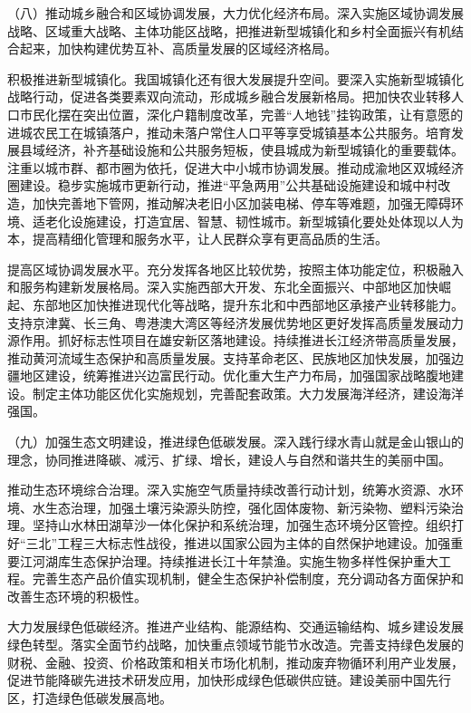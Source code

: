 \documentclass[10pt, UTF8]{ctexbook} %
\begin{document}
（八）推动城乡融合和区域协调发展，大力优化经济布局。深入实施区域协调发展战略、区域重大战略、主体功能区战略，把推进新型城镇化和乡村全面振兴有机结合起来，加快构建优势互补、高质量发展的区域经济格局。

积极推进新型城镇化。我国城镇化还有很大发展提升空间。要深入实施新型城镇化战略行动，促进各类要素双向流动，形成城乡融合发展新格局。把加快农业转移人口市民化摆在突出位置，深化户籍制度改革，完善“人地钱”挂钩政策，让有意愿的进城农民工在城镇落户，推动未落户常住人口平等享受城镇基本公共服务。培育发展县域经济，补齐基础设施和公共服务短板，使县城成为新型城镇化的重要载体。注重以城市群、都市圈为依托，促进大中小城市协调发展。推动成渝地区双城经济圈建设。稳步实施城市更新行动，推进“平急两用”公共基础设施建设和城中村改造，加快完善地下管网，推动解决老旧小区加装电梯、停车等难题，加强无障碍环境、适老化设施建设，打造宜居、智慧、韧性城市。新型城镇化要处处体现以人为本，提高精细化管理和服务水平，让人民群众享有更高品质的生活。

提高区域协调发展水平。充分发挥各地区比较优势，按照主体功能定位，积极融入和服务构建新发展格局。深入实施西部大开发、东北全面振兴、中部地区加快崛起、东部地区加快推进现代化等战略，提升东北和中西部地区承接产业转移能力。支持京津冀、长三角、粤港澳大湾区等经济发展优势地区更好发挥高质量发展动力源作用。抓好标志性项目在雄安新区落地建设。持续推进长江经济带高质量发展，推动黄河流域生态保护和高质量发展。支持革命老区、民族地区加快发展，加强边疆地区建设，统筹推进兴边富民行动。优化重大生产力布局，加强国家战略腹地建设。制定主体功能区优化实施规划，完善配套政策。大力发展海洋经济，建设海洋强国。

（九）加强生态文明建设，推进绿色低碳发展。深入践行绿水青山就是金山银山的理念，协同推进降碳、减污、扩绿、增长，建设人与自然和谐共生的美丽中国。

推动生态环境综合治理。深入实施空气质量持续改善行动计划，统筹水资源、水环境、水生态治理，加强土壤污染源头防控，强化固体废物、新污染物、塑料污染治理。坚持山水林田湖草沙一体化保护和系统治理，加强生态环境分区管控。组织打好“三北”工程三大标志性战役，推进以国家公园为主体的自然保护地建设。加强重要江河湖库生态保护治理。持续推进长江十年禁渔。实施生物多样性保护重大工程。完善生态产品价值实现机制，健全生态保护补偿制度，充分调动各方面保护和改善生态环境的积极性。

大力发展绿色低碳经济。推进产业结构、能源结构、交通运输结构、城乡建设发展绿色转型。落实全面节约战略，加快重点领域节能节水改造。完善支持绿色发展的财税、金融、投资、价格政策和相关市场化机制，推动废弃物循环利用产业发展，促进节能降碳先进技术研发应用，加快形成绿色低碳供应链。建设美丽中国先行区，打造绿色低碳发展高地。
\end{document}
